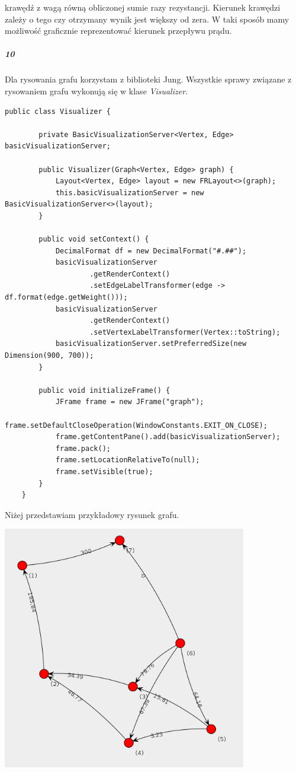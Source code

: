\documentclass[12pt,a4paper]{article}
\begin{document}
krawędź z wagą równą obliczonej sumie razy rezystancji. Kierunek krawędzi
zależy o tego czy otrzymany wynik jest większy od zera. W taki sposób mamy
możliwość graficznie reprezentować kierunek przepływu prądu.
\subparagraph{10} Dla rysowania grafu korzystam z biblioteki Jung. Wszystkie
sprawy związane z rysowaniem grafu wykonują się w klase \emph{Visualizer}.
\begin{Verbatim}[fontsize=\small]
    public class Visualizer {

        private BasicVisualizationServer<Vertex, Edge> basicVisualizationServer;

        public Visualizer(Graph<Vertex, Edge> graph) {
            Layout<Vertex, Edge> layout = new FRLayout<>(graph);
            this.basicVisualizationServer = new BasicVisualizationServer<>(layout);
        }

        public void setContext() {
            DecimalFormat df = new DecimalFormat("#.##");
            basicVisualizationServer
                    .getRenderContext()
                    .setEdgeLabelTransformer(edge -> df.format(edge.getWeight()));
            basicVisualizationServer
                    .getRenderContext()
                    .setVertexLabelTransformer(Vertex::toString);
            basicVisualizationServer.setPreferredSize(new Dimension(900, 700));
        }

        public void initializeFrame() {
            JFrame frame = new JFrame("graph");
            frame.setDefaultCloseOperation(WindowConstants.EXIT_ON_CLOSE);
            frame.getContentPane().add(basicVisualizationServer);
            frame.pack();
            frame.setLocationRelativeTo(null);
            frame.setVisible(true);
        }
    }
\end{Verbatim}
Niżej przedstawiam przykładowy rysunek grafu.
\begin{center}
    \includegraphics[width=0.8\textwidth]{img/graph}
\end{center}
\end{document}
